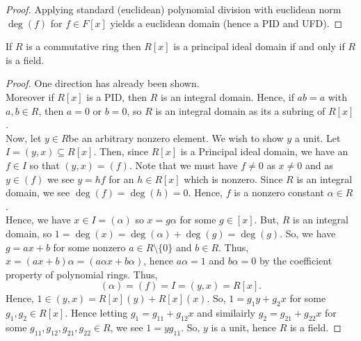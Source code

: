 \begin{proof}
	Applying standard (euclidean) polynomial division with euclidean norm \(\deg \left( f \right) \) for \(f \in F\left[ x \right] \) yields a euclidean domain (hence a PID and UFD).
\end{proof}
\begin{theorem}
	If \(R\) is a commutative ring then \(R\left[ x \right] \) is a principal ideal domain if and only if \(R\) is a field.
\end{theorem}
\begin{proof}
One direction has already been shown.\\
Moreover if \(R\left[ x \right] \) is a PID, then \(R\) is an integral domain. Hence, if \(ab = a\) with \(a, b \in R\), then \(a = 0\) or \(b = 0\), so \(R\) is an integral domain as its a subring of \(R\left[ x \right] \).\\
Now, let \(y \in R\)be an arbitrary nonzero element. We wish to show \(y\) a unit. Let \(I = \left( y, x \right) \subseteq R\left[ x \right] \). Then, since \(R\left[ x \right] \) is a Principal ideal domain, we have an \(f \in I\) so that \(\left( y, x \right) = \left( f \right)  \). Note that we must have \(f \neq 0\) as \(x \neq 0\) and as \(y \in \left( f \right) \) we see \(y = hf\) for an \(h \in R\left[ x \right] \) which is nonzero. Since \(R\) is an integral domain, we see \(\deg \left( f \right) = \deg \left( h \right)  = 0\). Hence, \(f\) is a nonzero constant \(\alpha \in R\) .\\
Hence, we have \(x \in I = \left( \alpha \right) \) so \(x = g\alpha\) for some \(g \in \left[ x \right] \). But, \(R\) is an integral domain, so \(1 = \deg \left( x \right)  = \deg \left( \alpha \right)  + \deg \left( g \right) = \deg \left( g \right) \). So, we have \(g= ax + b\) for some nonzero \(a \in R\setminus \{0\} \) and \(b \in R\). Thus, \(x = \left( ax + b \right) \alpha = \left( a \alpha x + b\alpha \right) \), hence \(a \alpha=1\) and \(b \alpha =0\) by the coefficient property of polynomial rings. Thus, \[
	\left( \alpha \right) = \left( f \right) = I = \left( y, x \right) = R\left[ x \right]
.\]
Hence, \(1 \in \left( y, x \right)  = R\left[ x \right] \left( y \right) + R\left[ x \right] \left( x \right) \). So, \(1 = g_1 y + g_2 x\) for some \(g_1, g_2 \in R\left[ x \right] \). Hence letting \(g_1 = g_{11} + g_{12}x\) and similairly \(g_2 = g_{21} + g_{22}x\) for some \(g_{11}, g_{12}, g_{21}, g_{22} \in R\),  we see \(1 = yg_{11}\).   So, \(y\) is a unit, hence \(R\) is a field.
\end{proof}
